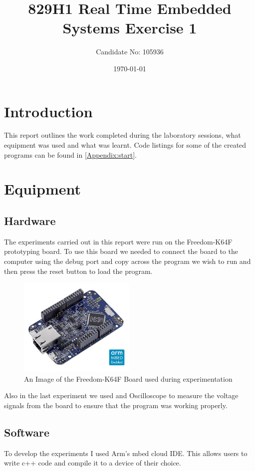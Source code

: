 \documentclass[a4paper,12pt]{scrartcl}
\title{829H1 Real Time Embedded Systems Exercise 1}
\author{Candidate No: 105936}
\date{\today}
\begin{document}
	
	\begin{titlepage}
		\maketitle
	\end{titlepage}
	
	\tableofcontents
	\newpage
	
	\section{Introduction}
	{
		This report outlines the work completed during the laboratory sessions, what equipment was used and what was learnt. Code listings for some of the created programs can be found in \cref{Appendix:start}.
	}

	\section{Equipment}
	{
		\subsection{Hardware}{
			The experiments carried out in this report were run on the Freedom-K64F prototyping board\cite{nxpproducts2014}. To use this board we needed to connect the board to the computer using the debug port and copy across the program we wish to run and then press the reset button to load the program.
			\begin{figure}[h]
				\centering
				\includegraphics[width=0.5\textwidth]{FRDM-K64F-ANGLE}
				\caption{An Image of the Freedom-K64F Board used during experimentation\cite{nxpproducts2014}}
				\label{img:FRDM-K64F}
			\end{figure}
			Also in the last experiment we used and Oscilloscope to measure the voltage signals from the board to ensure that the program was working properly.
		}
		\subsection{Software}
		{
			To develop the experiments I used Arm's mbed cloud IDE. This allows users to write c++ code and compile it to a device of their choice. 
		}
	}
	
\end{document}
